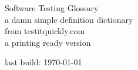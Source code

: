 \documentclass[a4paper, twoside, 12pt]{article}
\begin{document}
\thispagestyle{empty}
{\begingroup
\centering
\vfill
{\Huge Software Testing Glossary}\\[\baselineskip]
{\Large a damn simple definition dictionary}\\ [\baselineskip] 
{from testitquickly.com}\\ [\baselineskip]
{a printing ready version}\\ [\baselineskip] 

\vfill \null

last build: {\large\scshape \today}\par

\endgroup}

	\newpage



	\newpage

\tableofcontents

	\newpage

\pagestyle{plain}
\end{document}
